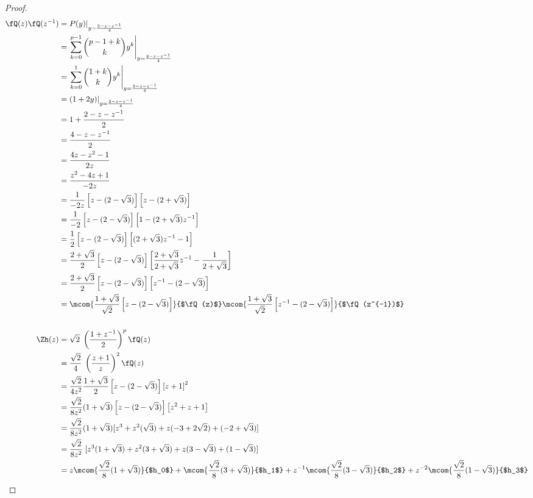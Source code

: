 \begin{proof}
\begin{align*}
  \fQ(z)\fQ(z^{-1})
    &= P(y)|_{y=\frac{2-z-z^{-1}}{4}}
  \\&= \left.
       \sum\limits_{k=0}^{p-1} {{p-1+k}\choose{k}} y^k
       \right|_{y=\frac{2-z-z^{-1}}{4}}
  \\&= \left.
         \sum\limits_{k=0}^{1} {{1+k}\choose{k}} y^k
       \right|_{y=\frac{2-z-z^{-1}}{4}}
  \\&= (1+2y)|_{y=\frac{2-z-z^{-1}}{4}}
  \\&= 1 + \frac{2-z-z^{-1}}{2}
  \\&= \frac{4-z-z^{-1}}{2}
  \\&= \frac{4z-z^2-1}{2z}
  \\&= \frac{z^2 - 4z +1}{-2z}
  \\&= \frac{1}{-2z}
       \left[z-(2-\sqrt{3}) \right]
       \left[z-(2+\sqrt{3}) \right]
  \\&= \frac{1}{-2}
       \left[z-(2-\sqrt{3}) \right]
       \left[1-(2+\sqrt{3})z^{-1} \right]
  \\&= \frac{1}{2}
       \left[z-(2-\sqrt{3}) \right]
       \left[(2+\sqrt{3})z^{-1} -1\right]
  \\&= \frac{2+\sqrt{3}}{2}
       \left[z-(2-\sqrt{3}) \right]
       \left[\frac{2+\sqrt{3}}{2+\sqrt{3}}z^{-1} -\frac{1}{2+\sqrt{3}}\right]
  \\&= \frac{2+\sqrt{3}}{2}
       \left[z-(2-\sqrt{3}) \right]
       \left[z^{-1} -(2-\sqrt{3}) \right]
  \\&= \mcom{\frac{1+\sqrt{3}}{\sqrt{2}}\left[z-(2-\sqrt{3}) \right]}{$\fQ(z)$}
       \mcom{\frac{1+\sqrt{3}}{\sqrt{2}}\left[z^{-1} -(2-\sqrt{3}) \right]}{$\fQ(z^{-1})$}
\\
\\
  \Zh(z)
    &= \sqrt{2}\;
       \left(\frac{1+z^{-1}}{2}\right)^p
       \fQ(z)
  \\&= \frac{\sqrt{2}}{4}\;
       \left(\frac{z+1}{z}\right)^2
       \fQ(z)
  \\&= \frac{\sqrt{2}}{4z^2}
       \frac{1+\sqrt{3}}{2}
       \left[ z-(2-\sqrt{3}) \right] \left[ z+1 \right]^2
  \\&= \frac{\sqrt{2}}{8z^2} (1+\sqrt{3})
       \left[ z-(2-\sqrt{3}) \right]
       \left[ z^2+z+1 \right]
  \\&= \frac{\sqrt{2}}{8z^2} (1+\sqrt{3})
       [z^3 + z^2(\sqrt{3}) + z(-3+2\sqrt{2}) + (-2+\sqrt{3})]
  \\&= \frac{\sqrt{2}}{8z^2}\;
       [z^3(1+\sqrt{3}) + z^2(3+\sqrt{3}) + z(3-\sqrt{3}) + (1-\sqrt{3})]
  \\&=    z     \mcom{\frac{\sqrt{2}}{8}(1+\sqrt{3})}{$h_0$} +
                \mcom{\frac{\sqrt{2}}{8}(3+\sqrt{3})}{$h_1$} +
          z^{-1}\mcom{\frac{\sqrt{2}}{8}(3-\sqrt{3})}{$h_2$} +
          z^{-2}\mcom{\frac{\sqrt{2}}{8}(1-\sqrt{3})}{$h_3$}
\end{align*}
\end{proof}

